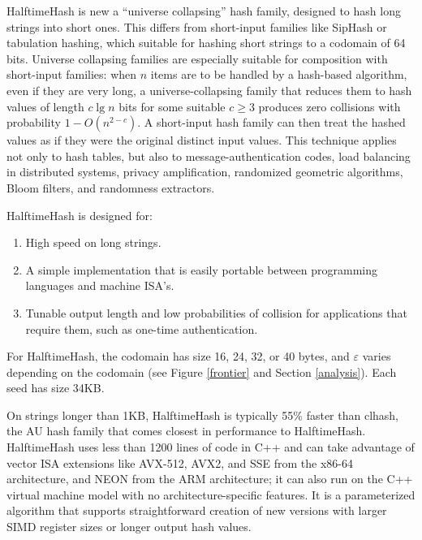 \documentclass[runningheads]{llncs}
\begin{document}
HalftimeHash is new a ``universe collapsing'' hash family, designed to hash long strings into short ones. \cite{linear-hash-functions,hashing-without-primes-revisited,cuckoo-journal}
This differs from short-input families like SipHash or tabulation hashing, which suitable for hashing short strings to a codomain of 64 bits. \cite{siphash,tabulation}
Universe collapsing families are especially suitable for composition with short-input families: when $n$ items are to be handled by a hash-based algorithm, even if they are very long, a universe-collapsing family that reduces them to hash values of length $c \lg n$ bits for some suitable $c \geq 3$ produces zero collisions with probability $1-O(n^{2-c})$.
A short-input hash family can then treat the hashed values as if they were the original distinct input values. \cite{universe-collapse-linear-probing,siphash,tabulation,simple-hash-functions-work}
This technique applies not only to hash tables, but also to message-authentication codes, load balancing in distributed systems, privacy amplification, randomized geometric algorithms, Bloom filters, and randomness extractors. \cite{poly1305,chord,privacy-amplification,random-closest-pair,simple-hash-functions-work,fuzzy-extractors}

HalftimeHash is designed for:

\begin{enumerate}
\item High speed on long strings.
\item A simple implementation that is easily portable between programming languages and machine ISA's.
\item Tunable output length and low probabilities of collision for applications that require them, such as one-time authentication. \cite{nacl}
\end{enumerate}

For HalftimeHash, the codomain has size 16, 24, 32, or 40 bytes, and $\varepsilon$ varies depending on the codomain (see Figure \ref{frontier} and Section \ref{analysis}).
Each seed has size 34KB.

On strings longer than 1KB, HalftimeHash is typically 55\% faster than clhash, the AU hash family that comes closest in performance to HalftimeHash.
HalftimeHash uses less than 1200 lines of code in C++ and can take advantage of vector ISA extensions like AVX-512, AVX2, and SSE from the x86-64 architecture, and NEON from the ARM architecture; it can also run on the C++ virtual machine model with no architecture-specific features.
It is a parameterized algorithm that supports straightforward creation of new versions with larger SIMD register sizes or longer output hash values.
\end{document}
